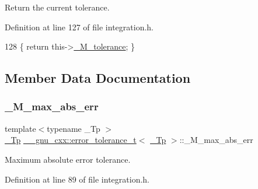 Return the current tolerance. 



Definition at line 127 of file integration.\+h.


\begin{DoxyCode}
128       \{ \textcolor{keywordflow}{return} this->\hyperlink{struct____gnu__cxx_1_1error__tolerance__t_a261304757b9ff28304ee94d67405b2a6}{\_M\_tolerance}; \}
\end{DoxyCode}


\subsection{Member Data Documentation}
\mbox{\label{struct____gnu__cxx_1_1error__tolerance__t_a55773fc8e99f5906ba9a2b2f03a141fb}} 
\subsubsection{\texorpdfstring{\+\_\+\+M\+\_\+max\+\_\+abs\+\_\+err}{\_M\_max\_abs\_err}}
{\footnotesize\ttfamily template$<$typename \+\_\+\+Tp $>$ \\
\hyperlink{namespace____gnu__cxx_a3b19a9c800ca194374ef9172290f7d79}{\+\_\+\+Tp} \hyperlink{struct____gnu__cxx_1_1error__tolerance__t}{\+\_\+\+\_\+gnu\+\_\+cxx\+::error\+\_\+tolerance\+\_\+t}$<$ \hyperlink{namespace____gnu__cxx_a3b19a9c800ca194374ef9172290f7d79}{\+\_\+\+Tp} $>$\+::\+\_\+\+M\+\_\+max\+\_\+abs\+\_\+err}



Maximum absolute error tolerance. 



Definition at line 89 of file integration.\+h.

\mbox{\label{struct____gnu__cxx_1_1error__tolerance__t_add7d7bfa6c6f5c36f50dde1497486e9e}} 
